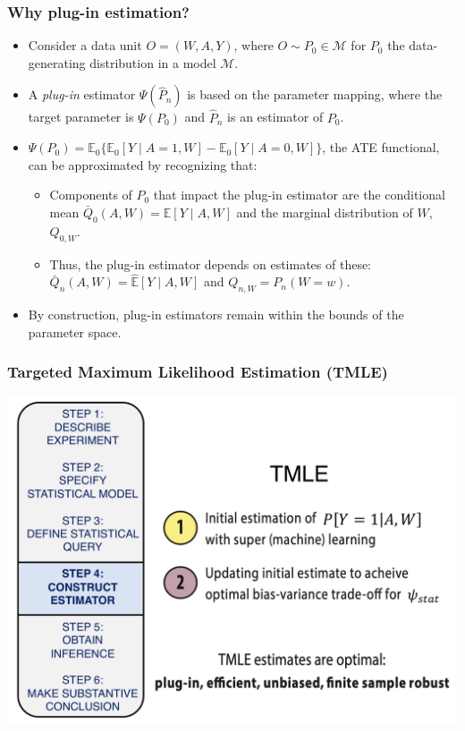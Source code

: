 \documentclass[t]{beamer}
\begin{document}
\begin{frame}
  \frametitle{Why plug-in estimation?}
  \begin{itemize}
    \item Consider a data unit $O = (W, A, Y)$, where $O \sim P_0 \in
      \mathcal{M}$ for $P_0$ the data-generating distribution in a model
      $\mathcal{M}$.
    \item A \textit{plug-in} estimator $\Psi(\hat{P}_n)$ is based on the
      parameter mapping, where the target parameter is $\Psi(P_0)$ and
      $\hat{P}_n$ is an estimator of $P_0$.
    \item $\Psi(P_0) = \mathbb{E}_0\{\mathbb{E}_0[Y \mid A = 1, W] -
      \mathbb{E}_0[Y \mid A = 0, W]\}$, the ATE functional, can be approximated
      by recognizing that:
      \begin{itemize}
        \item Components of $P_0$ that impact the plug-in estimator are the
          conditional mean $\bar{Q}_0(A,W) = \mathbb{E}[Y \mid A, W]$ and the
          marginal distribution of $W$, $Q_{0,W}$.
        \item Thus, the plug-in estimator depends on estimates of these:
          $\bar{Q}_n(A,W) = \hat{\mathbb{E}}[Y \mid A, W]$ and $Q_{n,W} =
          P_n(W = w)$.
      \end{itemize}
    \item By construction, plug-in estimators remain within the bounds of the
      parameter space.
  \end{itemize}
\end{frame}

\begin{frame}
  \frametitle{Targeted Maximum Likelihood Estimation (TMLE)}
  \vspace{-20pt}
  \begin{center}
  \includegraphics[width = 1.05\textwidth]{figures/tmle.pdf}
  \end{center}
\end{frame}
\end{document}
